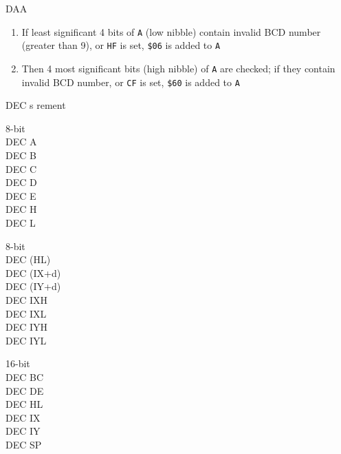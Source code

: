 \documentclass[12pt,twoside,openright,a4paper]{book}
\begin{document}
\begin{basedescript}{
	\desclabelstyle{\multilinelabel}
	\desclabelwidth{3cm}}
\begin{DetailItem}{DAA}
		\begin{enumerate}
			\item If least significant 4 bits of {\tt A} (low nibble) contain invalid BCD number (greater than 9), or {\tt HF} is set, {\tt \$06} is added to {\tt A}
			\item Then 4 most significant bits (high nibble) of {\tt A} are checked; if they contain invalid BCD number, or {\tt CF} is set, {\tt \$60} is added to {\tt A}
		\end{enumerate}
		
		\begin{DetailEffects}[p]
			\FlagsDAA
		\end{DetailEffects}
		
		\begin{DetailTiming}
		\end{DetailTiming}

	\end{DetailItem}

	\begin{DetailItem}{DEC s}
		{rement}
		{}

		\begin{DetailVariants}
			\textnormal{8-bit}\\
			DEC A\\
			DEC B\\
			DEC C\\
			DEC D\\
			DEC E\\
			DEC H\\
			DEC L

			\columnbreak
			\textnormal{8-bit}\\
			DEC (HL)\\
			DEC (IX+d)\\
			DEC (IY+d)\\
			DEC IXH\UNDOC\\
			DEC IXL\UNDOC\\
			DEC IYH\UNDOC\\
			DEC IYL\UNDOC

			\columnbreak
			\textnormal{16-bit}\\
			DEC BC\\
			DEC DE\\
			DEC HL\\
			DEC IX\\
			DEC IY\\
			DEC SP
		\end{DetailVariants}


\end{DetailItem}
\end{basedescript}
\end{document}
